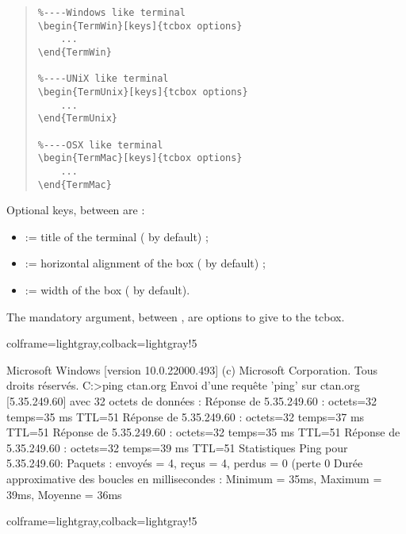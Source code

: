 \documentclass[11pt,a4paper]{ltxdoc}
\begin{document}
\begin{quote}
\begin{verbatim}
%----Windows like terminal
\begin{TermWin}[keys]{tcbox options}
    ...
\end{TermWin}

%----UNiX like terminal
\begin{TermUnix}[keys]{tcbox options}
    ...
\end{TermUnix}

%----OSX like terminal
\begin{TermMac}[keys]{tcbox options}
    ...
\end{TermMac}
\end{verbatim}
\end{quote}

Optional keys, between \MontreCode{[...]} are :

\begin{itemize}
	\item {} := title of the terminal ( by default) ;
	\item {} := horizontal alignment of the box ( by default) ;
	\item {} := width of the box ( by default).
\end{itemize}

\medskip

The mandatory argument, between , are options to give to the tcbox.

\begin{tcblisting}{colframe=lightgray,colback=lightgray!5}
\begin{TermWin}{}
Microsoft Windows [version 10.0.22000.493]
(c) Microsoft Corporation. Tous droits réservés.
C:\Users\test>ping ctan.org
Envoi d'une requête 'ping' sur ctan.org [5.35.249.60] avec 32 octets de données :
Réponse de 5.35.249.60 : octets=32 temps=35 ms TTL=51
Réponse de 5.35.249.60 : octets=32 temps=37 ms TTL=51
Réponse de 5.35.249.60 : octets=32 temps=35 ms TTL=51
Réponse de 5.35.249.60 : octets=32 temps=39 ms TTL=51
Statistiques Ping pour 5.35.249.60:
Paquets : envoyés = 4, reçus = 4, perdus = 0 (perte 0%
Durée approximative des boucles en millisecondes :
Minimum = 35ms, Maximum = 39ms, Moyenne = 36ms
\end{TermWin}
\end{tcblisting}

\begin{tcblisting}{colframe=lightgray,colback=lightgray!5}
\end{tcblisting}
\end{document}
